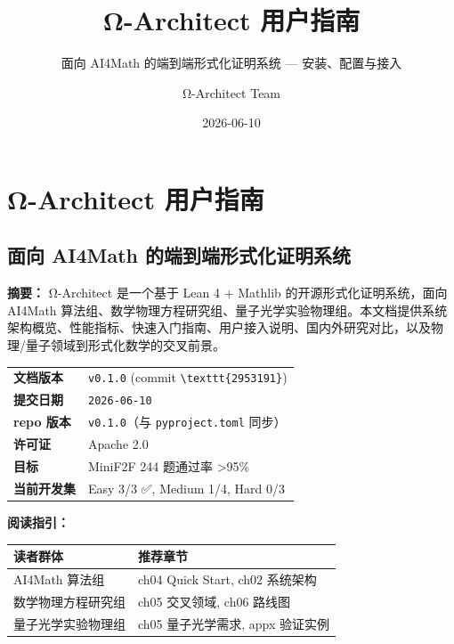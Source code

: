 \documentclass[
  11pt,
  a4paper,
]{ctexrep}
\title{Ω-Architect 用户指南}
\subtitle{面向 AI4Math 的端到端形式化证明系统 --- 安装、配置与接入}
\author{Ω-Architect Team}
\date{2026-06-10}
\newcounter{none} %
\renewcommand*\contentsname{Table of contents}
\newcommand\contentsname{Table of contents}
\begin{document}
\maketitle

\renewcommand*\contentsname{目录}
{
\setcounter{tocdepth}{2}
\tableofcontents
}


\chapter{Ω-Architect
用户指南}\label{ux3c9-architect-ux7528ux6237ux6307ux5357}

\section{面向 AI4Math
的端到端形式化证明系统}\label{ux9762ux5411-ai4math-ux7684ux7aefux5230ux7aefux5f62ux5f0fux5316ux8bc1ux660eux7cfbux7edf}

\vspace{0.5cm}

\textbf{摘要：} Ω-Architect 是一个基于 Lean 4 + Mathlib
的开源形式化证明系统，面向 AI4Math
算法组、数学物理方程研究组、量子光学实验物理组。本文档提供系统架构概览、性能指标、快速入门指南、用户接入说明、国内外研究对比，以及物理/量子领域到形式化数学的交叉前景。

\vspace{0.3cm}

{\def\LTcaptype{none} %
\begin{longtable}[]{@{}ll@{}}
\toprule\noalign{}
\endhead
\bottomrule\noalign{}
\endlastfoot
\textbf{文档版本} & \texttt{v0.1.0} (commit
\texttt{\textbackslash{}texttt\{2953191\}}) \\
\textbf{提交日期} & \texttt{2026-06-10} \\
\textbf{repo 版本} & \texttt{v0.1.0}（与 \texttt{pyproject.toml}
同步） \\
\textbf{许可证} & Apache 2.0 \\
\textbf{目标} & MiniF2F 244 题通过率 \textgreater95\% \\
\textbf{当前开发集} & Easy 3/3 ✅, Medium 1/4, Hard 0/3 \\
\end{longtable}
}

\textbf{阅读指引：}

{\def\LTcaptype{none} %
\begin{longtable}[]{@{}ll@{}}
\toprule\noalign{}
读者群体 & 推荐章节 \\
\midrule\noalign{}
\endhead
\bottomrule\noalign{}
\endlastfoot
AI4Math 算法组 & ch04 Quick Start, ch02 系统架构 \\
数学物理方程研究组 & ch05 交叉领域, ch06 路线图 \\
量子光学实验物理组 & ch05 量子光学需求, appx 验证实例 \\
\end{longtable}
}
\end{document}
